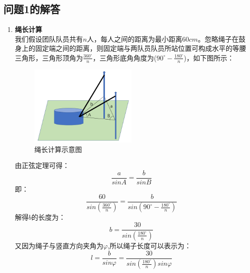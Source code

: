 \documentclass{cumcm}
\begin{document}
\subsection{问题1的解答}
\begin{enumerate}
\item \textbf{绳长计算}\\
我们假设团队队员共有$n$人，每人之间的距离为最小距离$60cm$。忽略绳子在鼓身上的固定端之间的距离，则固定端与两队员队员所站位置可构成水平的等腰三角形，三角形顶角为$\frac{360^{\circ}}{n}$，三角形底角角度为($90^{\circ}-\frac{180^{\circ}}{n}$)，如下图所示：
\begin{figure}[H]
\centering
\includegraphics[width=0.5\textwidth]{img/string.png}
\caption{绳长计算示意图}
\end{figure}
由正弦定理可得：
\begin{displaymath}
\frac{a}{sinA}=\frac{b}{sinB}
\end{displaymath}
即：
\begin{displaymath}
\frac{60}{sin({\frac{360^{\circ}}{n}})}=\frac{b}{sin({90^{\circ}-\frac{180^{\circ}}{n}})}
\end{displaymath}
解得$b$的长度为：
\begin{displaymath}
b=\frac{30}{sin( \frac{180^{\circ}}{n})}
\end{displaymath}
又因为绳子与竖直方向夹角为$\varphi$,所以绳子长度可以表示为：
\begin{equation}
l=\frac{b}{sin\varphi}=\frac{30}{sin(\frac{180^{\circ}}{n})sin\varphi}
\end{equation}


\end{enumerate}
\end{document}
